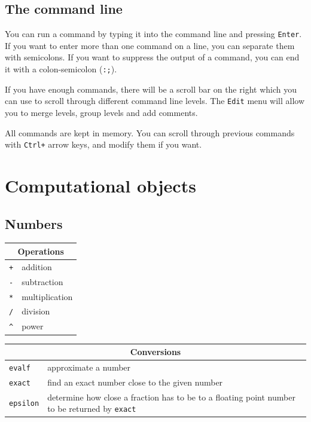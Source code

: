 \documentclass{article}
\begin{document}
\subsection{The command line}

You can run a command by typing it into the command
line and pressing \texttt{Enter}.  If you want to enter more than one
command on a line, you can separate them with semicolons.  If you want
to suppress the output of a command, you can end it with a
colon-semicolon (\texttt{:;}).

If you have enough commands, there will be a scroll bar on the right
which you can use to scroll through different command line levels.  The
\texttt{Edit} menu will allow you to merge levels, group levels and
add comments.

All commands are kept in memory.  You can scroll through previous
commands with \texttt{Ctrl+} arrow keys, and modify them if you want.

\section{Computational objects}

\subsection{Numbers}

\begin{center}
\begin{tabular}{|p{}|p{}|}
\hline
\multicolumn{2}{|c|}{\textbf{Operations}}\\
\hline\hline
\texttt{+}    & addition\\
\texttt{-}    & subtraction \\
\texttt{*}    & multiplication  \\
\texttt{/}    & division\\
\texttt{\^{}} & power  \\
\hline
\end{tabular}
\end{center}

\begin{center}
\begin{tabular}{|p{}|p{}|}
\hline
\multicolumn{2}{|c|}{\textbf{Conversions}}\\
\hline\hline
\texttt{evalf}   & approximate a number\\
\texttt{exact}   & find an exact number close to the given number\\
\texttt{epsilon} & determine how close a fraction has to be to
                   a floating point number to be returned by
		   \texttt{exact}\\
\hline
\end{tabular}
\end{center}
\end{document}
